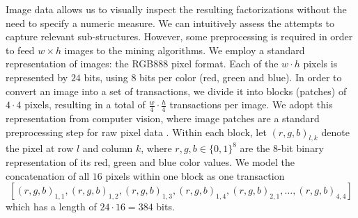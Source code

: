 Image data allows us to visually inspect the resulting factorizations without the need to specify a numeric measure. We can intuitively assess the attempts to capture relevant sub-structures. 
However, some preprocessing is required in order to feed $w \times h$ images to the mining algorithms. 
We employ a standard representation of images: the RGB888 pixel format. Each of the $w \cdot h$ pixels is represented by $24$ bits, using $8$ bits per color (red, green and blue). 
In order to convert an image into a set of transactions, we divide it into blocks (patches) of $4 \cdot 4$ pixels, resulting in a total of $\frac{w}{4} \cdot\frac{h}{4}$ transactions per image. We adopt this representation from computer vision, where image patches are a standard preprocessing step for raw pixel data \citep{jarrett2009what}.
Within each block, let $(r,g,b)_{l,k}$ denote the pixel at row $l$ and column $k$, where $r,g,b\in\{0,1\}^8$ are the $8$-bit binary representation of its red, green and blue color values.
We model the concatenation of all $16$ pixels within one block as one transaction
\begin{equation*}
\left[(r,g,b)_{1,1},(r,g,b)_{1,2},(r,g,b)_{1,3},(r,g,b)_{1,4},(r,g,b)_{2,1},\dots,(r,g,b)_{4,4}\right]
\end{equation*}
which has a length of $24\cdot 16=384$ bits. 

